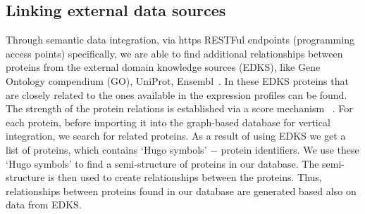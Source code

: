 \documentclass{bmcart}
\begin{document}
\subsection{Linking external data sources}

Through semantic data integration, via https RESTFul endpoints
(programming access points) specifically, we are able to find
additional relationships between proteins from the external domain
knowledge sources (EDKS), like Gene Ontology compendium (GO), UniProt,
Ensembl~\cite{11, 36, 37}. In these EDKS proteins that are closely related
to the ones available in the expression profiles can be found. The
strength of the protein relations is established via a score mechanism~\cite{11}
. For each protein, before importing it into the graph-based
database for vertical integration, we search for related proteins. As a
result of using EDKS we get a list of proteins, which contains
{\textquoteleft}Hugo symbols{\textquoteright} $-$ protein identifiers.
We use these {\textquoteleft}Hugo symbols{\textquoteright} to find a
semi-structure of proteins in our database. The semi-structure is then
used to create relationships between the proteins. Thus, relationships
between proteins found in our database are generated based also on data
from EDKS.
\end{document}
